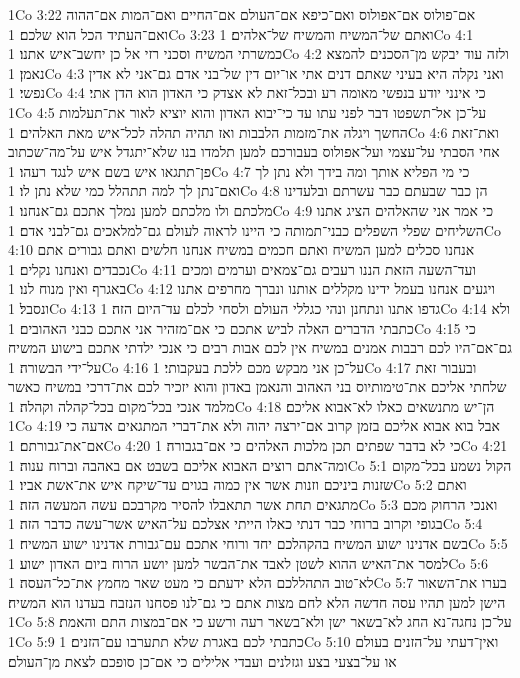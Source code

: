 1Co 3:22  אם־פולוס אם־אפולוס ואם־כיפא אם־העולם אם־החיים ואם־המות אם־ההוה ואם־העתיד הכל הוא שלכם׃
1Co 3:23  ואתם של־המשיח והמשיח של־אלהים׃
1Co 4:1  כמשרתי המשיח וסכני רזי אל כן יחשב־איש אתנו׃
1Co 4:2  ולזה עוד יבקש מן־הסכנים להמצא נאמן׃
1Co 4:3  ואני נקלה היא בעיני שאתם דנים אתי או־יום דין של־בני אדם גם־אני לא אדין נפשי׃
1Co 4:4  כי אינני יודע בנפשי מאומה רע ובכל־זאת לא אצדק כי האדון הוא הדן אתי׃
1Co 4:5  על־כן אל־תשפטו דבר לפני עתו עד כי־יבוא האדון והוא יוציא לאור את־תעלמות החשך ויגלה את־מזמות הלבבות ואז תהיה תהלה לכל־איש מאת האלהים׃
1Co 4:6  ואת־זאת אחי הסבתי על־עצמי ועל־אפולוס בעבורכם למען תלמדו בנו שלא־יתגדל איש על־מה־שכתוב פן־תתגאו איש בשם איש לנגד רעהו׃
1Co 4:7  כי מי הפליא אותך ומה בידך ולא נתן לך ואם־נתן לך למה תתהלל כמי שלא נתן לו׃
1Co 4:8  הן כבר שבעתם כבר עשרתם ובלעדינו מלכתם ולו מלכתם למען נמלך אתכם גם־אנחנו׃
1Co 4:9  כי אמר אני שהאלהים הציג אתנו השליחים שפלי השפלים כבני־תמותה כי היינו לראוה לעולם גם־למלאכים גם־לבני אדם׃
1Co 4:10  אנחנו סכלים למען המשיח ואתם חכמים במשיח אנחנו חלשים ואתם גבורים אתם נכבדים ואנחנו נקלים׃
1Co 4:11  ועד־השעה הזאת הננו רעבים גם־צמאים וערמים ומכים באגרף ואין מנוח לנו׃
1Co 4:12  ויגעים אנחנו בעמל ידינו מקללים אותנו ונברך מחרפים אתנו ונסבל׃
1Co 4:13  גדפו אתנו ונתחנן ונהי כגללי העולם ולסחי לכלם עד־היום הזה׃
1Co 4:14  ולא כתבתי הדברים האלה לביש אתכם כי אם־מזהיר אני אתכם כבני האהובים׃
1Co 4:15  כי גם־אם־היו לכם רבבות אמנים במשיח אין לכם אבות רבים כי אנכי ילדתי אתכם בישוע המשיח על־ידי הבשורה׃
1Co 4:16  על־כן אני מבקש מכם ללכת בעקבותי׃
1Co 4:17  ובעבור זאת שלחתי אליכם את־טימותיוס בני האהוב והנאמן באדון והוא יזכיר לכם את־דרכי במשיח כאשר מלמד אנכי בכל־מקום בכל־קהלה וקהלה׃
1Co 4:18  הן־יש מתנשאים כאלו לא־אבוא אליכם׃
1Co 4:19  אבל בוא אבוא אליכם בזמן קרוב אם־ירצה יהוה ולא את־דברי המתגאים אדעה כי אם־את־גבורתם׃
1Co 4:20  כי לא בדבר שפתים תכן מלכות האלהים כי אם־בגבורה׃
1Co 4:21  ומה־אתם רוצים האבוא אליכם בשבט אם באהבה וברוח ענוה׃
1Co 5:1  הקול נשמע בכל־מקום שזנות ביניכם וזנות אשר אין כמוה בגוים עד־שיקח איש את־אשת אביו׃
1Co 5:2  ואתם מתגאים תחת אשר תתאבלו להסיר מקרבכם עשה המעשה הזה׃
1Co 5:3  ואנכי הרחוק מכם בגופי וקרוב ברוחי כבר דנתי כאלו הייתי אצלכם על־האיש אשר־עשה כדבר הזה׃
1Co 5:4  בשם אדנינו ישוע המשיח בהקהלכם יחד ורוחי אתכם עם־גבורת אדנינו ישוע המשיח׃
1Co 5:5  למסר את־האיש ההוא לשטן לאבד את־הבשר למען יושע הרוח ביום האדון ישוע׃
1Co 5:6  לא־טוב התהללכם הלא ידעתם כי מעט שאר מחמץ את־כל־העסה׃
1Co 5:7  בערו את־השאור הישן למען תהיו עסה חדשה הלא לחם מצות אתם כי גם־לנו פסחנו הנזבח בעדנו הוא המשיח׃
1Co 5:8  על־כן נחגה־נא החג לא־בשאר ישן ולא־בשאר רעה ורשע כי אם־במצות התם והאמת׃
1Co 5:9  כתבתי לכם באגרת שלא תתערבו עם־הזנים׃
1Co 5:10  ואין־דעתי על־הזנים בעולם או על־בצעי בצע וגזלנים ועבדי אלילים כי אם־כן סופכם לצאת מן־העולם׃
